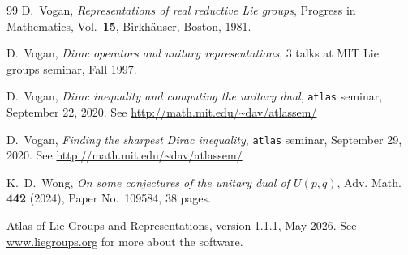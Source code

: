 \documentclass[11pt]{amsart}
\theoremstyle{plain}
\theoremstyle{definition}
\begin{document}
\begin{thebibliography}{99}
 D.~Vogan,
	\emph{Representations of real reductive Lie groups}, Progress in Mathematics, Vol.~\textbf{15}, Birkh\"auser, Boston, 1981.
	
	
 D.~Vogan, \emph{Dirac operators and unitary
		representations}, 3 talks at MIT Lie groups seminar, Fall 1997.

 D.~Vogan,
\emph{Dirac inequality and computing the unitary dual}, \texttt{atlas} seminar, September 22, 2020.
See \url{http://math.mit.edu/~dav/atlassem/}

 D.~Vogan,
\emph{Finding the sharpest Dirac inequality}, \texttt{atlas} seminar, September 29, 2020.
See \url{http://math.mit.edu/~dav/atlassem/}

 K.~D.~Wong, \emph{On some conjectures of the unitary dual of $U(p, q)$}, Adv. Math.
\textbf{442} (2024), Paper No.~109584, 38 pages.

 Atlas of Lie Groups and Representations, version 1.1.1, May 2026. See \url{www.liegroups.org}
 for more about the software.
	
\end{thebibliography}
\end{document}
